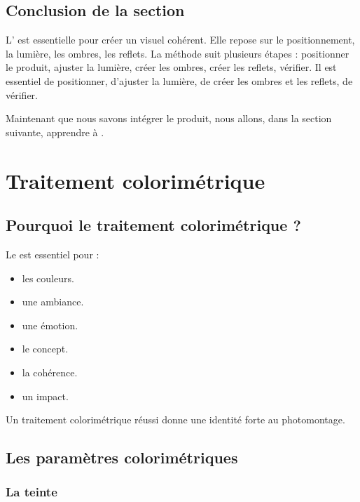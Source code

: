 \subsection*{Conclusion de la section}

L' est essentielle pour créer un visuel cohérent. Elle repose sur le positionnement, la lumière, les ombres, les reflets. La méthode suit plusieurs étapes : positionner le produit, ajuster la lumière, créer les ombres, créer les reflets, vérifier. Il est essentiel de positionner, d'ajuster la lumière, de créer les ombres et les reflets, de vérifier.

Maintenant que nous savons intégrer le produit, nous allons, dans la section suivante, apprendre à .

\section{Traitement colorimétrique}

\subsection{Pourquoi le traitement colorimétrique ?}

Le  est essentiel pour :

\begin{itemize}
    \item {} les couleurs.
    \item {} une ambiance.
    \item {} une émotion.
    \item {} le concept.
    \item {} la cohérence.
    \item {} un impact.
\end{itemize}

Un traitement colorimétrique réussi donne une identité forte au photomontage.

\subsection{Les paramètres colorimétriques}

\subsubsection{La teinte}

